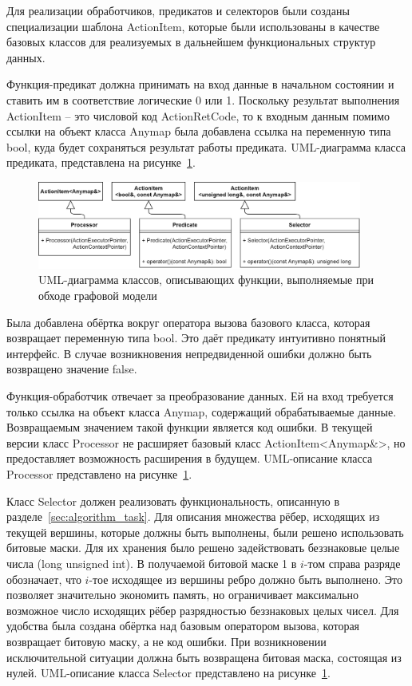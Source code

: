 Для реализации обработчиков, предикатов и селекторов были созданы специализации шаблона \textsf{ActionItem}, которые были использованы в качестве базовых классов для реализуемых в дальнейшем функциональных структур данных.

Функция-предикат должна принимать на вход данные в начальном состоянии и ставить им в соответствие логические 0 или 1. Поскольку результат выполнения \textsf{ActionItem} -- это числовой код \textsf{ActionRetCode}, то к входным данным помимо ссылки на объект класса Anymap была добавлена ссылка на переменную типа bool, куда будет сохраняться результат работы предиката. UML-диаграмма класса предиката, представлена на рисунке~\ref{fig:UMLGraphFunctions}.
\begin{figure}[!ht]
    \centering
    \includegraphics[width=0.95\textwidth]{figures/UML.graphFunctions.png}
    \caption{UML-диаграмма классов, описывающих функции, выполняемые при обходе графовой модели}
    \label{fig:UMLGraphFunctions}
\end{figure}

Была добавлена обёртка вокруг оператора вызова базового класса, которая возвращает переменную типа bool. Это даёт предикату интуитивно понятный интерфейс. В случае возникновения непредвиденной ошибки должно быть возвращено значение \textsf{false}.

Функция-обработчик отвечает за преобразование данных. Ей на вход требуется только ссылка на объект класса Anymap, содержащий обрабатываемые данные. Возвращаемым значением такой функции является код ошибки. В текущей версии класс \textsf{Processor} не расширяет базовый класс \textsf{ActionItem<Anymap\&>}, но предоставляет возможность расширения в будущем. UML-описание класса \textsf{Processor} представлено на рисунке~\ref{fig:UMLGraphFunctions}.

Класс \textsf{Selector} должен реализовать функциональность, описанную в разделе~\ref{sec:algorithm_task}. Для описания множества рёбер, исходящих из текущей вершины, которые должны быть выполнены, были решено использовать битовые маски. Для их хранения было решено задействовать беззнаковые целые числа (\textsf{long unsigned int}). В получаемой битовой маске 1 в $i$-том справа разряде обозначает, что $i$-тое исходящее из вершины ребро должно быть выполнено. Это позволяет значительно экономить память, но ограничивает максимально возможное число исходящих рёбер разрядностью беззнаковых целых чисел. Для удобства была создана обёртка над базовым оператором вызова, которая возвращает битовую маску, а не код ошибки. При возникновении исключительной ситуации должна быть возвращена битовая маска, состоящая из нулей. UML-описание класса \textsf{Selector} представлено на рисунке~\ref{fig:UMLGraphFunctions}.

